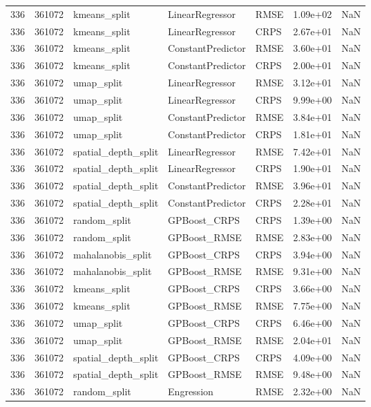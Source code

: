 \begin{tabular}{rrlllrr}
336 & 361072 & kmeans\_split & LinearRegressor & RMSE & 1.09e+02 & NaN \\
336 & 361072 & kmeans\_split & LinearRegressor & CRPS & 2.67e+01 & NaN \\
336 & 361072 & kmeans\_split & ConstantPredictor & RMSE & 3.60e+01 & NaN \\
336 & 361072 & kmeans\_split & ConstantPredictor & CRPS & 2.00e+01 & NaN \\
336 & 361072 & umap\_split & LinearRegressor & RMSE & 3.12e+01 & NaN \\
336 & 361072 & umap\_split & LinearRegressor & CRPS & 9.99e+00 & NaN \\
336 & 361072 & umap\_split & ConstantPredictor & RMSE & 3.84e+01 & NaN \\
336 & 361072 & umap\_split & ConstantPredictor & CRPS & 1.81e+01 & NaN \\
336 & 361072 & spatial\_depth\_split & LinearRegressor & RMSE & 7.42e+01 & NaN \\
336 & 361072 & spatial\_depth\_split & LinearRegressor & CRPS & 1.90e+01 & NaN \\
336 & 361072 & spatial\_depth\_split & ConstantPredictor & RMSE & 3.96e+01 & NaN \\
336 & 361072 & spatial\_depth\_split & ConstantPredictor & CRPS & 2.28e+01 & NaN \\
336 & 361072 & random\_split & GPBoost\_CRPS & CRPS & 1.39e+00 & NaN \\
336 & 361072 & random\_split & GPBoost\_RMSE & RMSE & 2.83e+00 & NaN \\
336 & 361072 & mahalanobis\_split & GPBoost\_CRPS & CRPS & 3.94e+00 & NaN \\
336 & 361072 & mahalanobis\_split & GPBoost\_RMSE & RMSE & 9.31e+00 & NaN \\
336 & 361072 & kmeans\_split & GPBoost\_CRPS & CRPS & 3.66e+00 & NaN \\
336 & 361072 & kmeans\_split & GPBoost\_RMSE & RMSE & 7.75e+00 & NaN \\
336 & 361072 & umap\_split & GPBoost\_CRPS & CRPS & 6.46e+00 & NaN \\
336 & 361072 & umap\_split & GPBoost\_RMSE & RMSE & 2.04e+01 & NaN \\
336 & 361072 & spatial\_depth\_split & GPBoost\_CRPS & CRPS & 4.09e+00 & NaN \\
336 & 361072 & spatial\_depth\_split & GPBoost\_RMSE & RMSE & 9.48e+00 & NaN \\
336 & 361072 & random\_split & Engression & RMSE & 2.32e+00 & NaN \\

\end{tabular}
